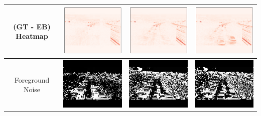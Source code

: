 \documentclass[11pt]{scrartcl} %
\theoremstyle{plain}
\begin{document}
\begin{minipage}{\linewidth}
\begin{tabular}{ | c | m{2.8cm} | m{2.8cm} | m{2.8cm} | }
	(GT - EB) Heatmap
	&
    \begin{minipage}{.3\textwidth}
      \includegraphics[width=\linewidth, width=25mm]{figures_video/traffic/rpca/hm_0.png}
    \end{minipage}	
	&
    \begin{minipage}{.3\textwidth}
      \includegraphics[width=\linewidth, width=25mm]{figures_video/traffic/pca/hm_0.png}
    \end{minipage}		
	&
    \begin{minipage}{.3\textwidth}
      \includegraphics[width=\linewidth, width=25mm]{figures_video/traffic/pca2/hm_0.png}
    \end{minipage}		
	\\[6ex] \hline	
	
	Foreground Noise
	&
    \begin{minipage}{.3\textwidth}
      \includegraphics[width=\linewidth, width=25mm]{figures_video/traffic/rpca/noise_0.png}
    \end{minipage}
	&
    \begin{minipage}{.3\textwidth}
      \includegraphics[width=\linewidth, width=25mm]{figures_video/traffic/pca/noise_0.png}
    \end{minipage}
	&
    \begin{minipage}{.3\textwidth}
      \includegraphics[width=\linewidth, width=25mm]{figures_video/traffic/pca2/noise_0.png}
    \end{minipage}
	\\[6ex] \hline	
	

\end{tabular}
\end{minipage}
\end{document}

